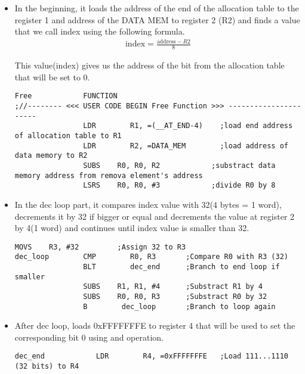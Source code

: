 \documentclass[pdftex,12pt,a4paper]{article}
\begin{document}
\begin{itemize}
    \item In the beginning, it loads the address of the end of the allocation table to the register 1 and address of the DATA MEM to register 2 (R2) and finds a value that we call index using the following formula.
    \begin{align*}
        \text{index} = \frac{\text{address} - R2}{8}
    \end{align*}
    \par This value(index) gives us the address of the bit from the allocation table that will be set to 0.
    \begin{lstlisting}[caption=Beginning, style=customasm]
Free			FUNCTION			
;//-------- <<< USER CODE BEGIN Free Function >>> ----------------------				
                LDR        R1, =(__AT_END-4)    ;load end address of allocation table to R1
                LDR        R2, =DATA_MEM        ;load address of data memory to R2
                SUBS    R0, R0, R2            ;substract data memory address from remova element's address
                LSRS    R0, R0, #3            ;divide R0 by 8
    \end{lstlisting}
    
    \item In the dec loop part, it compares index value with 32(4 bytes = 1 word), decrements it by 32 if bigger or equal and decrements the value at register 2 by 4(1 word) and continues until index value is smaller than 32.
    \begin{lstlisting}[caption=dec\_loop, style=customasm]
                MOVS    R3, #32			;Assign 32 to R3
dec_loop        CMP        R0, R3		;Compare R0 with R3 (32)
                BLT        dec_end		;Branch to end loop if smaller
                SUBS    R1, R1, #4		;Substract R1 by 4
                SUBS    R0, R0, R3		;Substract R0 by 32
                B        dec_loop		;Branch to loop again
    \end{lstlisting}
    
    \item After dec loop, loads 0xFFFFFFFE to register 4 that will be used to set the corresponding bit 0 using and operation.
    \begin{lstlisting}[caption= After dec\_loop, style=customasm]
dec_end            LDR        R4, =0xFFFFFFFE	;Load 111...1110 (32 bits) to R4
    \end{lstlisting}
    

\end{itemize}
\end{document}

